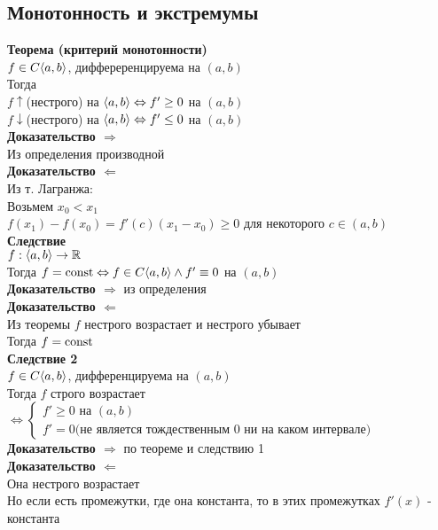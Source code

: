 \documentclass[12pt]{article}
\begin{document}
\subsection{Монотонность и экстремумы}
\textbf{Теорема (критерий монотонности)}\\
$f \in C\langle a, b \rangle$, диффереренцируема на $(a,b)$\\
Тогда\\
$f \uparrow$(нестрого) на $\langle a, b \rangle \Leftrightarrow f'\geq 0$ на $(a,b)$\\
$f \downarrow$(нестрого) на $ \langle a, b \rangle \Leftrightarrow f'\leq 0$ на $(a,b)$\\
\textbf{Доказательство $\Rightarrow$}\\
Из определения производной\\
\textbf{Доказательство $\Leftarrow$}\\
Из т. Лагранжа:\\
Возьмем $x_0 < x_1$\\
$f(x_1) - f(x_0) = f'(c) (x_1 - x_0) \geq 0$ для некоторого $c \in (a,b)$\\
\textbf{Следствие}\\
$f: \langle a, b \rangle \rightarrow \mathbb{R}$\\
Тогда $f = \operatorname{const} \Leftrightarrow f\in C\langle a, b\rangle \land f'\equiv 0$ на $(a,b)$\\
\textbf{Доказательство $\Rightarrow$} из определения\\
\textbf{Доказательство $\Leftarrow$}\\
Из теоремы $f$ нестрого возрастает и нестрого убывает\\
Тогда $f = \operatorname{const}$\\
\textbf{Следствие 2}\\
$f \in C\langle a, b \rangle$, дифференцируема на $(a,b)$\\
Тогда $f$ строго возрастает $\Leftrightarrow \left\{\begin{array}{l}
     f'\geq 0 \text{ на } (a,b)\\
     f' = 0 \text{(не является тождественным 0 ни на каком интервале)}
\end{array}\right.$\\
\textbf{Доказательство $\Rightarrow$} по теореме и следствию 1\\
\textbf{Доказательство $\Leftarrow$}\\
Она нестрого возрастает\\
Но если есть промежутки, где она константа, то в этих промежутках $f'(x)$ - константа\\
\end{document}
